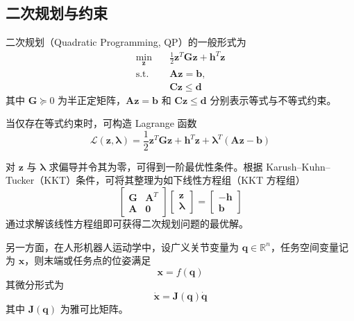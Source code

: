 \subsection{二次规划与约束}

二次规划（Quadratic Programming, QP）的一般形式为
\begin{equation}
	\begin{aligned}
		\min_{\mathbf{z}} \quad & 
		\frac{1}{2}\mathbf{z}^T \mathbf{G}\mathbf{z}
		+
		\mathbf{h}^T \mathbf{z} \\
		\text{s.t.} \quad & 
		\mathbf{A}\mathbf{z} = \mathbf{b}, \\
		& 
		\mathbf{C}\mathbf{z} \le \mathbf{d}
	\end{aligned}
	\label{eq:qp_general}
\end{equation}
其中 $\mathbf{G} \succeq 0$ 为半正定矩阵，$\mathbf{A}\mathbf{z} = \mathbf{b}$ 和 $\mathbf{C}\mathbf{z} \le \mathbf{d}$ 分别表示等式与不等式约束。

当仅存在等式约束时，可构造 Lagrange 函数
\begin{equation}
	\mathcal{L}(\mathbf{z},\boldsymbol{\lambda})
	=
	\frac{1}{2}\mathbf{z}^T \mathbf{G}\mathbf{z}
	+
	\mathbf{h}^T \mathbf{z}
	+
	\boldsymbol{\lambda}^T(\mathbf{A}\mathbf{z}-\mathbf{b})
\end{equation}

对 $\mathbf{z}$ 与 $\boldsymbol{\lambda}$ 求偏导并令其为零，可得到一阶最优性条件。根据 Karush–Kuhn–Tucker（KKT）条件，可将其整理为如下线性方程组（KKT 方程组）
\begin{equation}
	\begin{bmatrix}
		\mathbf{G} & \mathbf{A}^T \\
		\mathbf{A} & \mathbf{0}
	\end{bmatrix}
	\begin{bmatrix}
		\mathbf{z} \\
		\boldsymbol{\lambda}
	\end{bmatrix}
	=
	\begin{bmatrix}
		-\mathbf{h} \\
		\mathbf{b}
	\end{bmatrix}
\end{equation}
通过求解该线性方程组即可获得二次规划问题的最优解。

另一方面，在人形机器人运动学中，设广义关节变量为 $\mathbf{q} \in \mathbb{R}^n$，任务空间变量记为 $\mathbf{x}$，则末端或任务点的位姿满足
\begin{equation}
	\mathbf{x} = f(\mathbf{q})
\end{equation}
其微分形式为
\begin{equation}
	\dot{\mathbf{x}} = \mathbf{J}(\mathbf{q}) \dot{\mathbf{q}}
	\label{eq:task_velocity_mapping}
\end{equation}
其中 $\mathbf{J}(\mathbf{q})$ 为雅可比矩阵。

